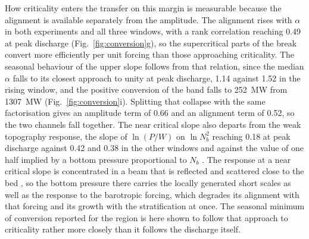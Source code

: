 \documentclass[a4paper,fleqn]{cas-sc}
\begin{document}
How criticality enters the transfer on this margin is measurable because the alignment is available separately from the amplitude. The alignment rises with $\alpha$ in both experiments and all three windows, with a rank correlation reaching 0.49 at peak discharge (Fig.~\ref{fig:conversion}g), so the supercritical parts of the break convert more efficiently per unit forcing than those approaching criticality. The seasonal behaviour of the upper slope follows from that relation, since the median $\alpha$ falls to its closest approach to unity at peak discharge, 1.14 against 1.52 in the rising window, and the positive conversion of the band falls to 252~MW from 1307~MW (Fig.~\ref{fig:conversion}i). Splitting that collapse with the same factorisation gives an amplitude term of 0.66 and an alignment term of 0.52, so the two channels fall together. The near critical slope also departs from the weak topography response, the slope of $\ln(P/W)$ on $\ln N_{b}^{2}$ reaching 0.18 at peak discharge against 0.42 and 0.38 in the other windows and against the value of one half implied by a bottom pressure proportional to $N_{b}$ \citep{bell:1975,llewellynsmith:2002,nycander:2005}. The response at a near critical slope is concentrated in a beam that is reflected and scattered close to the bed \citep{klymak:2011,hall_2013}, so the bottom pressure there carries the locally generated short scales as well as the response to the barotropic forcing, which degrades its alignment with that forcing and its growth with the stratification at once. The seasonal minimum of conversion reported for the region \citep{barbot_2021,tchilibou:2022} is here shown to follow that approach to criticality rather more closely than it follows the discharge itself.
\end{document}

